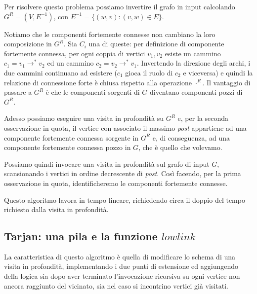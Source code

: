 Per risolvere questo problema possiamo invertire il grafo in input
calcolando $G^{R} = (V, E^{-1})$, con $E^{-1} = \{(w, v): (v, w) \in
E\}$.

Notiamo che le componenti fortemente connesse non cambiano la loro
composizione in $G^{R}$. Sia $C_{i}$ una di queste: per definizione di
componente fortemente connessa, per ogni coppia di vertici $v_{1},
v_{2}$ esiste un cammino $c_{1} = v_{1}\rightarrow^{*} v_{2}$ ed un
cammino $c_{2} = v_{2}\rightarrow^{*} v_{1}$. Invertendo la direzione
degli archi, i due cammini continuano ad esistere ($c_{1}$ gioca il
ruolo di $c_{2}$ e viceversa) e quindi la relazione di connessione
forte \`e chiusa rispetto alla operazione $\cdot ^{R}$. Il vantaggio
di passare a $G^{R}$ \`e che le componenti sorgenti di $G$ diventano
componenti pozzi di $G^{R}$.

Adesso possiamo eseguire una visita in profondit\`a su $G^{R}$
e, per la seconda osservazione in quota, il vertice con associato il
massimo \emph{post} appartiene ad una componente fortemente connessa
sorgente in $G^{R}$ e, di conseguenza, ad una componente fortemente
connessa pozzo in $G$, che \`e quello che volevamo.

Possiamo quindi invocare una visita in profondit\`a sul grafo di input
$G$, scansionando i vertici in ordine decrescente di
\emph{post}. Cos\`i facendo, per la prima osservazione in quota,
identificheremo le componenti fortemente connesse.

Questo algoritmo lavora in tempo lineare, richiedendo circa il doppio
del tempo richiesto dalla visita in profondit\`a.

\subsection{Tarjan: una pila e la funzione $lowlink$}
\label{subsection:tarjan-algorithm}
La caratteristica di questo algoritmo \`e quella di modificare lo
schema di una visita in profondit\`a, implementando i due punti di
estensione ed aggiungendo della logica sia dopo aver terminato
l'invocazione ricorsiva su ogni vertice non ancora raggiunto del
vicinato, sia nel caso si incontrino vertici gi\`a visitati.

